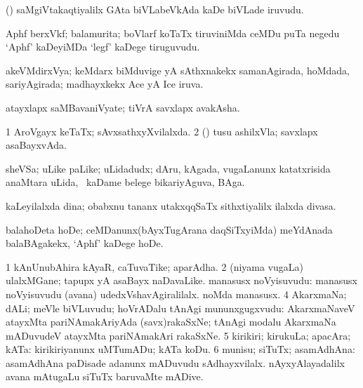 \bentry
{}
\gl{\nA}
\bmng
(\saM) saMgiVtakaqtiyalilx GAta biVLabeVkAda kaDe biVLade iruvudu. 
\emng
\eentry

\bentry
{}
\gl{\nA}
\bmng
Aphf berxVkf; balamurita; boVlarf koTaTx tiruviniMda ceMDu puTa negedu `Aphf' kaDeyiMDa `legf' kaDege tiruguvudu. 
\emng
\eentry

\bentry
{}
\gl{\gu}
\bmng
akeVMdirxVya; keMdarx biMduvige yA sAthxnakekx samanAgirada, hoMdada, sariyAgirada; madhayxkekx Ace yA Ice iruva. 
\emng
\eentry

\bentry
{}
\gl{\nA}
\bmng
atayxlapx saMBavaniVyate; tiVrA savxlapx avakAsha. 
\emng
\eentry

\bentry
{}
\gl{\gu}
\bmng
\bnum
\num{1} AroVgayx keTaTx; sAvxsathxyXvilalxda. 
\num{2} (\ame) tusu ashilxVla; savxlapx asaBayxvAda. 
\enum
\emng
\eentry

\bentry
{}
\gl{\nA}
\bmng
sheVSa; uLike paLike; uLidadudx; dAru, kAgada, \mo vugaLanunx katatxrisida anaMtara uLida, \sA\ kaDame belege bikariyAguva, BAga. 
\emng
\eentry

\bentry
{}
\gl{\nA}
\bmng
kaLeyilalxda dina; obabxnu tananx utakxqqSaTx sithxtiyalilx ilalxda divasa. 
\emng
\eentry

\bentry
{}
\gl{\sakirx}
\bmng
balahoDeta hoDe; ceMDanunx(bAyxTugArana daqSiTxyiMda) meYdAnada balaBAgakekx, `Aphf' kaDege hoDe. 
\emng
\eentry

\bentry
{}
\gl{\nA}
\bmng
\bnum
\num{1} kAnUnubAhira kAyaR, caTuvaTike; aparAdha. 
\num{2} (niyama \mo vugaLa) ulalxMGane; tapupx yA asaBayx naDavaLike. 
\banum
{} manasusx noVyisuvudu:  manasusx noVyisuvudu (avana) udedxVshavAgiralilalx. 
 noMda manasusx. 
\eanum
\numie
\num{4} AkarxmaNa; dALi; meVle biVLuvudu; hoVrADalu tAnAgi mununxgugxvudu:  AkarxmaNaveV atayxMta pariNAmakAriyAda (savx)rakaSxNe; tAnAgi modalu AkarxmaNa mADuvudeV atayxMta pariNAmakAri rakaSxNe. 
\num{5} kirikiri; kirukuLa; apacAra; kATa:  kirikiriyanunx uMTumADu; kATa koDu. 
\num{6} munisu; siTuTx; asamAdhAna:  asamAdhAna paDisade adanunx mADuvudu sAdhayxvilalx.  nAyxyAlayadalilx avana mAtugaLu siTuTx baruvaMte mADive. 
\enum
\emng

